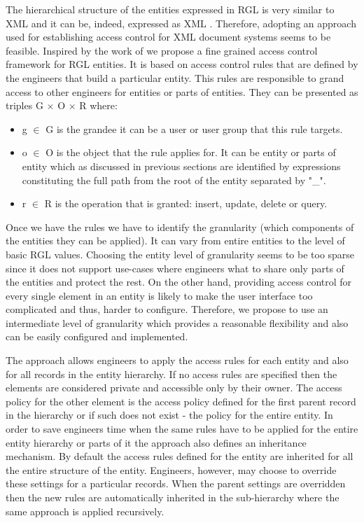 The hierarchical structure of the entities expressed in RGL is very similar to XML and it can be, indeed, expressed as XML \cite{feliksik2011}. Therefore, adopting an approach used for establishing access control for XML document systems seems to be feasible. Inspired by the work of \cite{wu2005access} we propose a fine grained access control framework for RGL entities. It is based on access control rules that are defined by the engineers that build a particular entity. This rules are responsible to grand access to other engineers for entities or parts of entities. They can be presented as triples G $\times$ O $\times$ R where: 
\begin{itemize}
	\item g $\in$ G is the grandee it can be a user or user group that this rule targets.
	\item o $\in$ O is the object that the rule applies for. It can be entity or parts of entity which as discussed in previous sections are identified by expressions constituting the full path from the root of the entity separated by "\_".  
	\item r $\in$ R is the operation that is granted: insert, update, delete or query.
\end{itemize}

Once we have the rules we have to identify the granularity (which components of the entities they can be applied). It can vary from entire entities to the level of basic RGL values. Choosing the entity level of granularity seems to be too sparse since it does not support use-cases where engineers what to share only parts of the entities and protect the rest. On the other hand, providing access control for every single element in an entity is likely to make the user interface too complicated and thus, harder to configure. Therefore, we propose to use an intermediate level of granularity which provides a reasonable flexibility and also can be easily configured and implemented. 

The approach allows engineers to apply the access rules for each entity and  also for all records in the entity hierarchy. If no access rules are specified then the elements are considered private and accessible only by their owner. The access policy for the other element is the access policy defined for the first parent record in the hierarchy or if such does not exist - the policy for the entire entity. In order to save engineers time when the same rules have to be applied for the entire entity hierarchy or parts of it the approach also defines an inheritance mechanism. By default the access rules defined for the entity are inherited for all the entire structure of the entity. Engineers, however, may choose to override these settings for a particular records. When the parent settings are overridden then the new rules are automatically inherited in the sub-hierarchy where the same approach is applied recursively.


